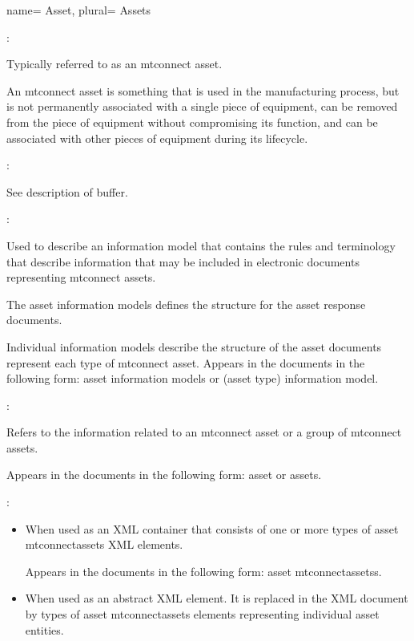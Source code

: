 {
  name= {Asset},
  plural= {Assets}
}
{
  :

  Typically referred to as an \gls{mtconnect asset}.

  An \gls{mtconnect asset} is something that is used in the manufacturing process, but is not permanently associated with a single piece of equipment, can be removed from the piece of equipment without compromising its function, and can be associated with other pieces of equipment during its lifecycle.

  :

  See description of \gls{buffer}.

  :

  Used to describe an \gls{information model} that contains the rules and terminology that describe information that may be included in electronic documents representing \glspl{mtconnect asset}.

  The \glspl{asset information model} defines the structure for the \glspl{asset response document}.

  Individual \glspl{information model} describe the structure of the \glspl{asset document} represent each type of \gls{mtconnect asset}. Appears in the documents in the following form: \glspl{asset information model} or (asset type) \gls{information model}.
  
  :

  Refers to the information related to an \gls{mtconnect asset} or a group of \glspl{mtconnect asset}.

  Appears in the documents in the following form: \gls{asset} or \glspl{asset}.

  :

  \begin{itemize}
      \item When used as an XML container that consists of one or more types of \gls{asset mtconnectassets} XML elements.
      
      Appears in the documents in the following form: \glspl{asset mtconnectassets}.
      
      \item When used as an abstract XML element. It is replaced in the XML document by types of \gls{asset mtconnectassets} elements representing individual \gls{asset} entities.
      

\end{itemize}}
